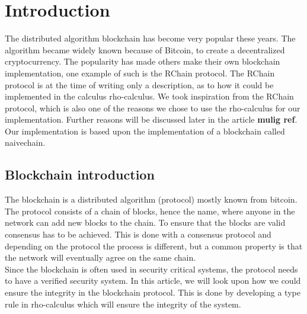 \section{Introduction}
The distributed algorithm blockchain has become very popular these years. The algorithm became widely known because of Bitcoin, to create a decentralized cryptocurrency.\citep{website:blockchain} The popularity has made others make their own blockchain implementation, one example of such is the RChain protocol. The RChain protocol is at the time of writing only a description, as to how it could be implemented in the calculus rho-calculus. We took inspiration from the RChain protocol, which is also one of the reasons we chose to use the rho-calculus for our implementation. Further reasons will be discussed later in the article \textbf{mulig ref}. Our implementation is based upon the implementation of a blockchain called naivechain\cite{naivechain}.

\subsection*{Blockchain introduction}
The blockchain is a distributed algorithm (protocol) mostly known from bitcoin. The protocol consists of a chain of blocks, hence the name, where anyone in the network can add new blocks to the chain. To ensure that the blocks are valid consensus has to be achieved. This is done with a consensus protocol and depending on the protocol the process is different, but a common property is that the network will eventually agree on the same chain.\\
Since the blockchain is often used in security critical systems, the protocol needs to have a verified security system.\cite{website:integrity} In this article, we will look upon how we could ensure the integrity in the blockchain protocol. This is done by developing a type rule in rho-calculus which will ensure the integrity of the system.
